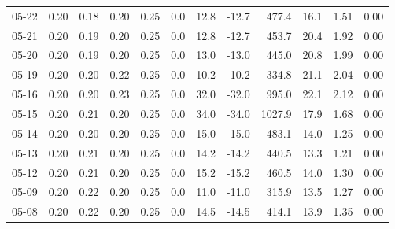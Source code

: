 \begin{threeparttable}
{\begin{tabular}{lrrrrrrrrrrr}
  05-22 &          0.20 &          0.18 &          0.20 &        0.25 &                 0.0 &                12.8 &      -12.7 &               477.4 &             16.1 &            1.51 &                   0.00 \\
  05-21 &          0.20 &          0.19 &          0.20 &        0.25 &                 0.0 &                12.8 &      -12.7 &               453.7 &             20.4 &            1.92 &                   0.00 \\
  05-20 &          0.20 &          0.19 &          0.20 &        0.25 &                 0.0 &                13.0 &      -13.0 &               445.0 &             20.8 &            1.99 &                   0.00 \\
  05-19 &          0.20 &          0.20 &          0.22 &        0.25 &                 0.0 &                10.2 &      -10.2 &               334.8 &             21.1 &            2.04 &                   0.00 \\
  05-16 &          0.20 &          0.20 &          0.23 &        0.25 &                 0.0 &                32.0 &      -32.0 &               995.0 &             22.1 &            2.12 &                   0.00 \\
  05-15 &          0.20 &          0.21 &          0.20 &        0.25 &                 0.0 &                34.0 &      -34.0 &              1027.9 &             17.9 &            1.68 &                   0.00 \\
  05-14 &          0.20 &          0.20 &          0.20 &        0.25 &                 0.0 &                15.0 &      -15.0 &               483.1 &             14.0 &            1.25 &                   0.00 \\
  05-13 &          0.20 &          0.21 &          0.20 &        0.25 &                 0.0 &                14.2 &      -14.2 &               440.5 &             13.3 &            1.21 &                   0.00 \\
  05-12 &          0.20 &          0.21 &          0.20 &        0.25 &                 0.0 &                15.2 &      -15.2 &               460.5 &             14.0 &            1.30 &                   0.00 \\
  05-09 &          0.20 &          0.22 &          0.20 &        0.25 &                 0.0 &                11.0 &      -11.0 &               315.9 &             13.5 &            1.27 &                   0.00 \\
  05-08 &          0.20 &          0.22 &          0.20 &        0.25 &                 0.0 &                14.5 &      -14.5 &               414.1 &             13.9 &            1.35 &                   0.00 \\

\end{tabular}}
\end{threeparttable}
